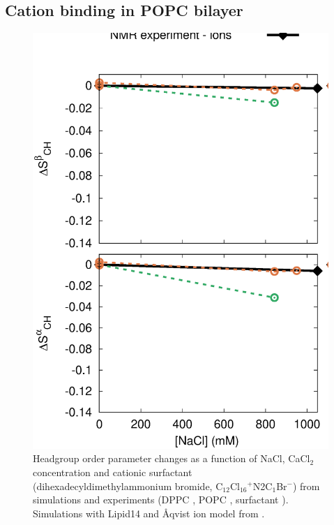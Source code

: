 \documentclass[aip,jcp,twocolumn]{revtex4}
\begin{document}
\subsection{Cation binding in POPC bilayer}

\begin{figure}[]
  \centering
  \includegraphics[width=16.0cm]{../Fig/OrdParChanges_NaCl_CaCl2_surf.eps}
  \caption{\label{OrderParameterCHANGESnewMODELS}
    Headgroup order parameter changes as a function of NaCl, CaCl$_2$ concentration and
    cationic surfactant (dihexadecyldimethylammonium bromide, C$_{12}$Cl$_{16}$$^+$N2C$_1$Br$^-$)
    from simulations and experiments (DPPC \cite{akutsu81}, POPC \cite{altenbach84}, surfactant \cite{scherer89}).
    Simulations with Lipid14 and Åqvist ion model from \cite{catte16,lipid14POPC0mMNaClfiles,lipid14POPC350mMCaClfiles,lipid14POPC1000mMCaClfiles}.
  }
\end{figure}
\end{document}
